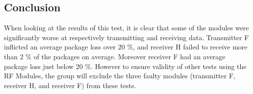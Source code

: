 \subsection*{Conclusion}
When looking at the results of this test, it is clear that some of the modules were significantly worse at respectively transmitting and receiving data.
Transmitter \textsf{F} inflicted an average package loss over 20 \%, and receiver \textsf{H} failed to receive more than 2 \% of the packages on average.
Moreover receiver \textsf{F} had an average package loss just below 20 \%.
However to ensure validity of other tests using the RF Modules, the group will exclude the three faulty modules (transmitter \textsf{F}, receiver \textsf{H}, and receiver \textsf{F}) from these tests.
